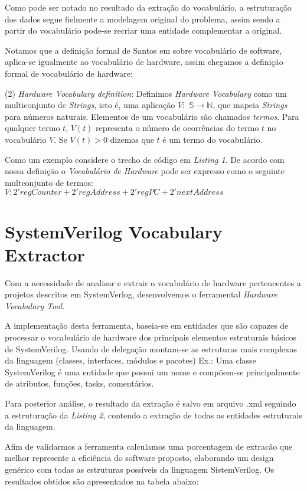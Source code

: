 \documentclass[12pt, twocolumn, a4paper]{article}
\begin{document}
Como pode ser notado no resultado da extração do vocabulário, a estruturação dos dados segue fielmente a modelagem original do problema, assim sendo a partir do vocabulário pode-se recriar uma entidade complementar a original.

Notamos que a definição formal de Santos em \cite{Santos2015} sobre vocabulário de software, aplica-se igualmente ao vocabulário de hardware, assim chegamos a definição formal de vocabulário de hardware:

(2) \textit{Hardware Vocabulary definition}: Definimos \textit{Hardware Vocabulary} como um multiconjunto de \textit{Strings}, isto é, uma aplicação $V:$ $\mathbb{S}\rightarrow\mathbb{N}$, que mapeia \textit{Strings} para números naturais. Elementos de um vocabulário são chamados \textit{termos}. Para qualquer termo $t$, $V(t)$ representa o número de ocorrências do termo $t$ no vocabulário $V$. Se $V(t)>0$ dizemos que $t$ é um termo do vocabulário.

Como um exemplo considere o trecho de código em \textit{Listing 1}. De acordo com nossa definição o \textit{Vocabulário de Hardware} pode ser expresso como o seguinte multconjunto de termos:\\

$V: 2'regCounter + 2'regAddress + 2'regPC + 2'nextAddress$


	\section{SystemVerilog Vocabulary Extractor}

\quad Com a necessidade de analisar e extrair o vocabulário de hardware pertencentes a projetos descritos em SystemVerlog, desenvolvemos o ferramental \textit{Hardware Vocabulary Tool}.

A implementação desta ferramenta, baseia-se em entidades que são capazes de processar o vocabulário de hardware dos principais elementos estruturais básicos de SystemVerilog. Usando de delegação montam-se as estruturas mais complexas da linguagem (classes, interfaces, módulos e pacotes) Ex.: Uma classe SystemVerilog é uma entidade que possui um nome e compõem-se principalmente de atributos, funções, tasks, comentários.

Para posterior análise, o resultado da extração é salvo em arquivo .xml seguindo a estruturação da \textit{Listing 2}, contendo a extração de todas as entidades estruturais da linguagem.
	
Afim de validarmos a ferramenta calculamos uma porcentagem de extracão que melhor represente a eficiência do software proposto, elaborando um design genérico com todas as estruturas possíveis da linguagem SistemVerilog. Os resultados obtidos são apresentados na tabela abaixo:
\end{document}
